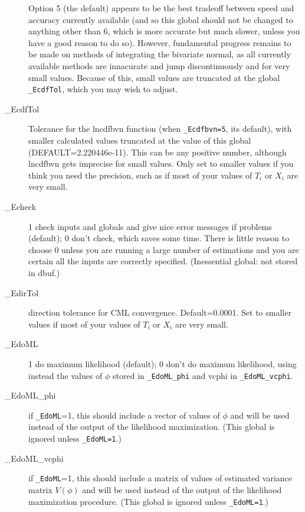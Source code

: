 \documentclass[11pt,titlepage]{article}
\begin{document}
\begin{description}
  Option 5 (the default) appears to be the best tradeoff between speed
  and accuracy currently available (and so this global should not be
  changed to anything other than 6, which is more accurate but much
  slower, unless you have a good reason to do so).  However,
  fundamental progress remains to be made on methods of integrating
  the bivariate normal, as all currently available methods are
  innacurate and jump discontinuously and for very small values.
  Because of this, small values are truncated at the global
  \texttt{\_EcdfTol}, which you may wish to adjust.

\item[\_EcdfTol] Tolerance for the lncdfbvn function (when
  \texttt{\_Ecdfbvn=5}, its default), with smaller calculated values
  truncated at the value of this global (DEFAULT=2.220446e-11).  This
  can be any positive number, although lncdfbvn gets imprecise for
  small values.  Only set to smaller values if you think you need the
  precision, such as if most of your values of $T_i$ or $X_i$ are very
  small.

\item[\_Echeck] 1 check inputs and globals and give nice error
  messages if problems (default); 0 don't check, which saves some
  time.  There is little reason to choose 0 unless you are running a
  large number of estimations and you are certain all the inputs are
  correctly specified.  (Inessential global: not stored in dbuf.)

\item[\_EdirTol] direction tolerance for CML convergence.
  Default=0.0001.  Set to smaller values if most of your values of
  $T_i$ or $X_i$ are very small.

\item[\_EdoML] 1 do maximum likelihood (default); 0 don't do maximum
  likelihood, using instead the values of $\phi$ stored in
  \texttt{\_EdoML\_phi} and vcphi in \texttt{\_EdoML\_vcphi}.

\item[\_EdoML\_phi] if \texttt{\_EdoML}=1, this should include a
  vector of values of $\phi$ and will be used instead of the output of
  the likelihood maximization.  (This global is ignored unless
  \texttt{\_EdoML=1}.)

\item[\_EdoML\_vcphi] if \texttt{\_EdoML}=1, this should include a
  matrix of values of estimated variance matrix $V(\phi)$ and will be
  used instead of the output of the likelihood maximization procedure.
  (This global is ignored unless \texttt{\_EdoML=1}.)


\end{description}
\end{document}
